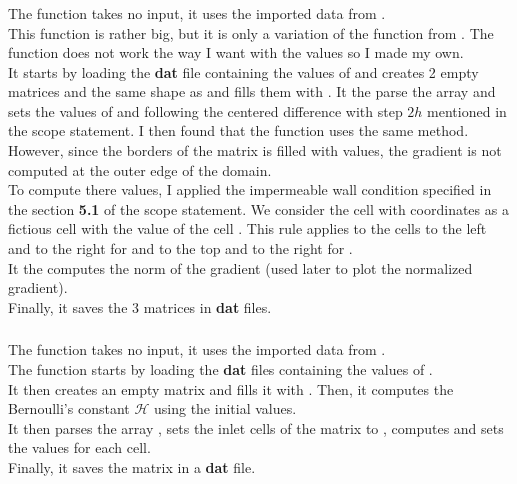 \subsubsection{\textcolor{func}{}}
The function \textcolor{func}{} takes no input, it uses the imported data
from .\\
This function is rather big, but it is only a variation of the 
function from . The function  does not work
the way I want with the  values so I made my own.\\
It starts by loading the \textbf{dat} file containing the values of 
and creates 2 empty matrices  and  the same shape as
 and fills them with . It the parse the 
array and sets the values of  and  following the centered
difference with step $2h$ mentioned in the scope statement. I then found that
the function  uses the same method. However, since the
borders of the matrix  is filled with  values, the
gradient is not computed at the outer edge of the domain.\\
To compute there values, I applied the impermeable wall condition specified in
the section \textbf{5.1} of the scope statement. We consider the 
 cell with coordinates \py{[i - 1, j]} as a fictious cell with
the value of the cell \py{[i, j]}. This rule applies to the cells to the left
and to the right for  and to the top and to the right for
.\\
It the computes the norm of the gradient (used later to plot the normalized
gradient).\\
Finally, it saves the 3 matrices in \textbf{dat} files.

\subsubsection{\textcolor{func}{}}
The function  takes no input, it uses the imported data
from .\\
The function starts by loading the \textbf{dat} files containing the values of
.\\
It then creates an empty matrix  and fills it with .
Then, it computes the Bernoulli's constant $\mathcal{H}$ using the initial
values.\\
It then parses the array , sets the inlet cells of the
 matrix to , computes and sets the values for
each cell.\\
Finally, it saves the matrix in a \textbf{dat} file.

